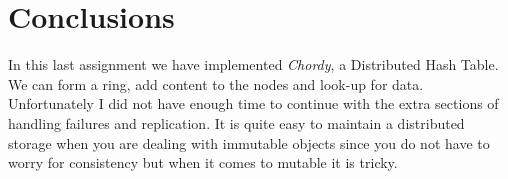 \documentclass[a4paper, 10pt]{article}
\begin{document}
\section{Conclusions}

In this last assignment we have implemented \emph{Chordy}, a Distributed Hash
Table. We can form a ring, add content to the nodes and look-up for data.
Unfortunately I did not have enough time to continue with the extra sections of
handling failures and replication. It is quite easy to maintain a distributed
storage when you are dealing with immutable objects since you do not have to
worry for consistency but when it comes to mutable it is tricky.
\end{document}
